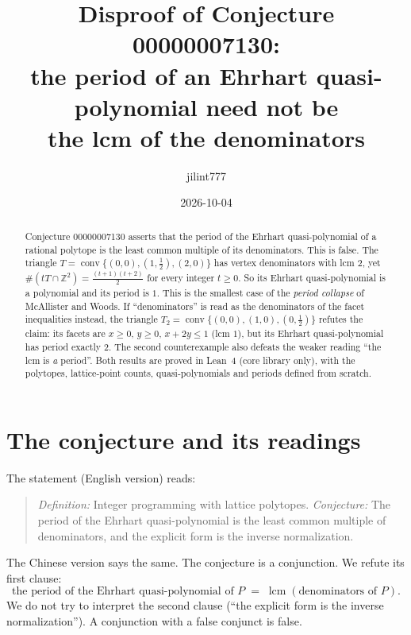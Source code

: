 \documentclass[11pt]{article}
\title{Disproof of Conjecture 00000007130:\\
the period of an Ehrhart quasi-polynomial need not be\\ the lcm of the denominators}
\author{jilint777}
\date{2026-10-04}
\theoremstyle{definition}
\theoremstyle{remark}
\newcommand{\Z}{\mathbb Z}
\newcommand{\conv}{\operatorname{conv}}
\newcommand{\lcm}{\operatorname{lcm}}
\begin{document}
\sloppy
\maketitle

\begin{abstract}
Conjecture 00000007130 asserts that the period of the Ehrhart quasi-polynomial of a
rational polytope is the least common multiple of its denominators. This is false.
The triangle $T=\conv\{(0,0),(1,\tfrac12),(2,0)\}$ has vertex denominators with
lcm $2$, yet $\#(tT\cap\Z^2)=\frac{(t+1)(t+2)}{2}$ for every integer $t\ge0$. So its
Ehrhart quasi-polynomial is a polynomial and its period is $1$. This is the smallest case of the
\emph{period collapse} of McAllister and Woods. If ``denominators'' is read as the denominators of
the facet inequalities instead, the triangle $T_2=\conv\{(0,0),(1,0),(0,\tfrac12)\}$ refutes the claim:
its facets are $x\ge0$, $y\ge0$, $x+2y\le1$ (lcm $1$), but its Ehrhart quasi-polynomial has
period exactly $2$. The second counterexample also defeats the weaker reading ``the lcm is
\emph{a} period''. Both results are proved in Lean~4 (core library only), with the polytopes,
lattice-point counts, quasi-polynomials and periods defined from scratch.
\end{abstract}

\section{The conjecture and its readings}

The statement (English version) reads:
\begin{quote}
\emph{Definition:} Integer programming with lattice polytopes. \emph{Conjecture:} The period of the
Ehrhart quasi-polynomial is the least common multiple of denominators, and the explicit form is
the inverse normalization.
\end{quote}
The Chinese version says the same. The conjecture is a conjunction. We refute its first clause:
\begin{equation}\label{eq:clause}
\text{the period of the Ehrhart quasi-polynomial of } P \;=\; \lcm(\text{denominators of } P).
\end{equation}
We do not try to interpret the second clause (``the explicit form is the inverse
normalization''). A conjunction with a false conjunct is false.
\end{document}

